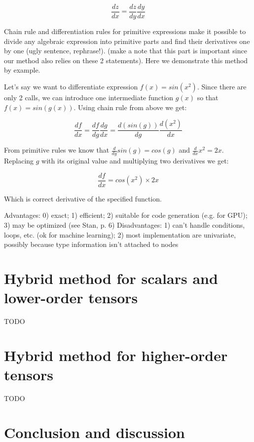 \documentclass[conference]{IEEEtran}
\begin{document}
$$\frac{dz}{dx} = \frac{dz}{dy}\frac{dy}{dx}$$

Chain rule and differentiation rules for primitive expressions make it possible to divide any algebraic expression into primitive parts and find their derivatives one by one (ugly sentence, rephrase!). (make a note that this part is important since our method also relies on these 2 statements). Here we demonstrate this method by example. 

Let's say we want to differentiate expression $f(x) = sin(x^2)$. Since there are only 2 calls, we can introduce one intermediate function $g(x)$ so that $f(x) = sin(g(x))$. Using chain rule from above we get: 

$$\frac{df}{dx} = \frac{df}{dg}\frac{dg}{dx} = \frac{d(sin(g))}{dg}\frac{d(x^2)}{dx}$$

From primitive rules we know that $\frac{d}{dg}sin(g) = cos(g)$ and $\frac{d}{dx}x^2 = 2x$. Replacing $g$ with its original value and multiplying two derivatives we get: 

$$\frac{df}{dx} = cos(x^2) \times 2x$$

Which is correct derivative of the specified function. 

Advantages: 0) exact; 1) efficient; 2) suitable for code generation (e.g. for GPU); 3) may be optimized (see Stan, p. 6)
Disadvantages: 1) can't handle conditions, loops, etc. (ok for machine learning); 2) most implementation are univariate, possibly because type information isn't attached to nodes



\section{Hybrid method for scalars and lower-order tensors}

TODO

\section{Hybrid method for higher-order tensors}

TODO

\newpage

\section{Conclusion and discussion}





 




\end{document}

